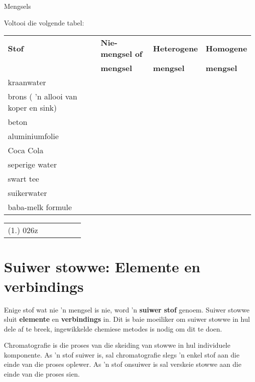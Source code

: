 \begin{exercises}{Mengsels}
{Voltooi die volgende tabel: \par
\hspace{-3cm}
\begin{tabular}{|l|p{2.5cm}|p{2.5cm}|p{2.5cm}|}\hline
\textbf{Stof} & \textbf{Nie-mengsel of} & \textbf{Heterogene} & \textbf{Homogene} \\ 
 & \textbf{mengsel} & \textbf{mengsel} & \textbf{mengsel} \\ \hline
kraanwater & & & \\ \hline
brons ( 'n allooi van koper en sink) & & & \\ \hline
beton & & & \\ \hline
aluminiumfolie & & & \\ \hline
Coca Cola & & & \\ \hline
seperige water & & & \\ \hline
swart tee & & & \\ \hline
suikerwater & & & \\ \hline
baba-melk formule & & & \\ \hline
\end{tabular}
\practiceinfo
\begin{tabular}[h]{cccccc}
 (1.) 026z  &
\end{tabular} 
}
\end{exercises}


\section{Suiwer stowwe: Elemente en verbindings}
\nopagebreak
Enige stof wat nie 'n mengsel is nie, word 'n \textbf{suiwer stof} genoem. Suiwer stowwe sluit \textbf{elemente} en \textbf{verbindings} in. Dit is baie moeiliker om suiwer stowwe in hul dele af te breek, ingewikkelde chemiese metodes is nodig om dit te doen.\par


Chromatografie is die proses van die skeiding van stowwe in hul individuele komponente. As 'n stof suiwer is, sal chromatografie slegs 'n enkel stof aan die einde van die proses oplewer. As 'n stof onsuiwer is sal verskeie stowwe aan die einde van die proses sien.\par

